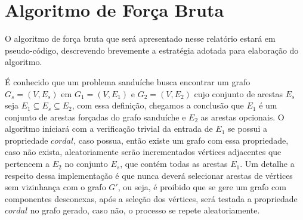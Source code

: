 \section{Algoritmo de Força Bruta}

O algoritmo de força bruta que será apresentado nesse relatório estará em pseudo-código, descrevendo brevemente a estratégia adotada para elaboração do algoritmo. 

É conhecido que um problema sanduíche busca encontrar um grafo $G_s = (V, E_s)$ em $G_1 = (V, E_1)$ e $G_2 = (V, E_2)$ cujo conjunto de arestas $E_s$ seja $E_1 \subseteq E_s \subseteq E_2$, com essa definição, chegamos a conclusão que $E_1$ é um conjunto de arestas forçadas do grafo sanduíche e $E_2$ as arestas opcionais. O algoritmo iniciará com a verificação trivial da entrada de $E_1$ se possui a propriedade $cordal$, caso possua, então existe um grafo com essa propriedade, caso não exista, aleatoriamente serão incrementados vértices adjacentes que pertencem a $E_2$ no conjunto $E_s$, que contém todas as arestas $E_1$. Um detalhe a respeito dessa implementação é que nunca deverá selecionar arestas de vértices sem vizinhança com o grafo $G'$, ou seja, é proibido que se gere um grafo com componentes desconexas, após a seleção dos vértices, será testada a propriedade $cordal$ no grafo gerado, caso não, o processo se repete aleatoriamente.